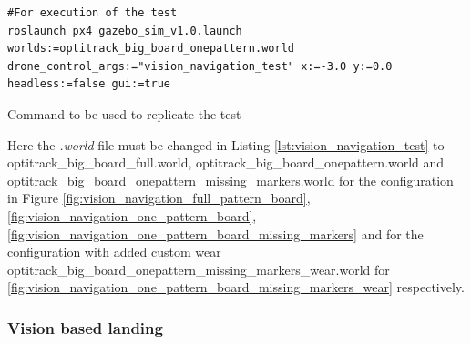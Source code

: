 \documentclass[../Head/report.tex]{subfiles}
\begin{document}
\begin{listing}[H] 
\begin{tcolorbox}[
    enhanced,
    attach boxed title to top left={xshift=6mm,yshift=-3mm},
    colback=lightgreen!20,
    colframe=lightgreen,
    fonttitle=\bfseries\color{black},
]
\begin{verbatim}
#For execution of the test
roslaunch px4 gazebo_sim_v1.0.launch worlds:=optitrack_big_board_onepattern.world drone_control_args:="vision_navigation_test" x:=-3.0 y:=0.0 headless:=false gui:=true
\end{verbatim}
\end{tcolorbox}
\caption{Command to be used to replicate the test}
\label{lst:vision_navigation_test}    
\end{listing} 

Here the \textit{.world} file must be changed in Listing \ref{lst:vision_navigation_test} to optitrack\_big\_board\_full.world, optitrack\_big\_board\_onepattern.world and optitrack\_big\_board\_onepattern\_missing\_markers.world for the configuration in Figure \ref{fig:vision_navigation_full_pattern_board}, \ref{fig:vision_navigation_one_pattern_board}, \ref{fig:vision_navigation_one_pattern_board_missing_markers} and for the configuration with added custom wear optitrack\_big\_board\_onepattern\_missing\_markers\_wear.world  for  \ref{fig:vision_navigation_one_pattern_board_missing_markers_wear} respectively. 

\subsubsection{Vision based landing}
\label{sec:vision_based_landing}
\end{document}
